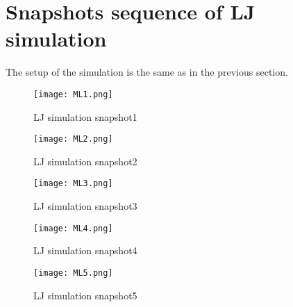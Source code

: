 \section{Snapshots sequence of LJ simulation}
    The setup of the simulation is the same as in the previous section.
    \graphicspath{ {./figures/milestone04/} }
    \begin{figure}[h]

    \centering
        \texttt{[image: ML1.png]}
        \caption{LJ simulation snapshot1}
    \label{fig:step1}
    \end{figure}
    \begin{figure}[!htb]
    \centering
        \texttt{[image: ML2.png]}
        \caption{LJ simulation snapshot2}
    \label{fig:step2}
    \end{figure}
    \begin{figure}[!htb]
    \centering
        \texttt{[image: ML3.png]}
        \caption{LJ simulation snapshot3}
    \label{fig:step3}
    \end{figure}
    \begin{figure}[!htb]
    \centering
        \texttt{[image: ML4.png]}
        \caption{LJ simulation snapshot4}
    \label{fig:step4}
    \end{figure}
    \begin{figure}[!htb]
    \centering
        \texttt{[image: ML5.png]}
        \caption{LJ simulation snapshot5}
    \label{fig:step5}
    \end{figure}


